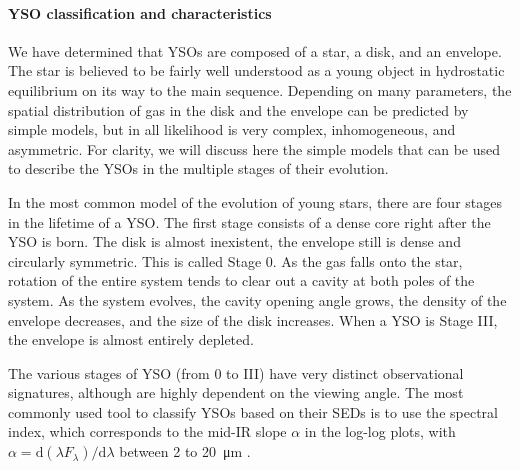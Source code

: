 



\paragraph{YSO classification and characteristics}

We have determined that YSOs are composed of a star, a disk, and an envelope. The star is believed to be fairly well understood as a young object in hydrostatic equilibrium on its way to the main sequence. Depending on many parameters, the spatial distribution of gas in the disk and the envelope can be predicted by simple models, but in all likelihood is very complex, inhomogeneous, and asymmetric. 
For clarity, we will discuss here the simple models that can be used to describe the YSOs in the multiple stages of their evolution.

In the most common model of the evolution of young stars, there are four stages in the lifetime of a YSO. The first stage consists of a dense core right after the YSO is born. The disk is almost inexistent, the envelope still is dense and circularly symmetric. This is called Stage 0. As the gas falls onto the star, rotation of the entire system tends to clear out a cavity at both poles of the system. As the system evolves, the cavity opening angle grows, the density of the envelope decreases, and the size of the disk increases. When a YSO is Stage III, the envelope is almost entirely depleted.

The various stages of YSO (from 0 to III) have very distinct observational signatures, although are highly dependent on the viewing angle. The most commonly used tool to classify YSOs based on their SEDs is to use the spectral index, which corresponds to the mid-IR slope $\alpha$ in the log-log plots, with $\alpha = \textrm{d}(\lambda F_\lambda)/\textrm{d}\lambda$ between 2 to \SI{20}{\micro\meter} \citep{McKee:2007bd}.

